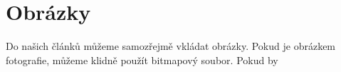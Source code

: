 \documentclass[a4paper, 11pt]{article}
\begin{document}
\section{Obrázky}\label{obrazky}
Do našich článků můžeme samozřejmě vkládat obrázky. Pokud je obrázkem fotografie, můžeme klidně použít
bitmapový soubor. Pokud by
\end{document}
